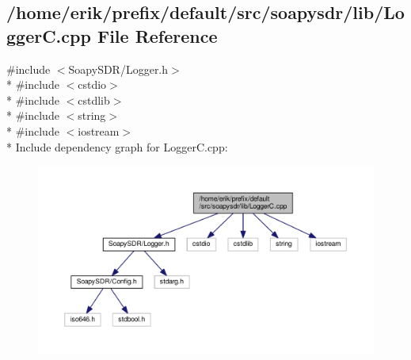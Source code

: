 \subsection{/home/erik/prefix/default/src/soapysdr/lib/\+LoggerC.cpp File Reference}
\label{LoggerC_8cpp}
{\ttfamily \#include $<$Soapy\+S\+D\+R/\+Logger.\+h$>$}\\*
{\ttfamily \#include $<$cstdio$>$}\\*
{\ttfamily \#include $<$cstdlib$>$}\\*
{\ttfamily \#include $<$string$>$}\\*
{\ttfamily \#include $<$iostream$>$}\\*
Include dependency graph for Logger\+C.\+cpp\+:
\nopagebreak
\begin{figure}[H]
\begin{center}
\leavevmode
\includegraphics[width=350pt]{d1/dd6/LoggerC_8cpp__incl}
\end{center}
\end{figure}
